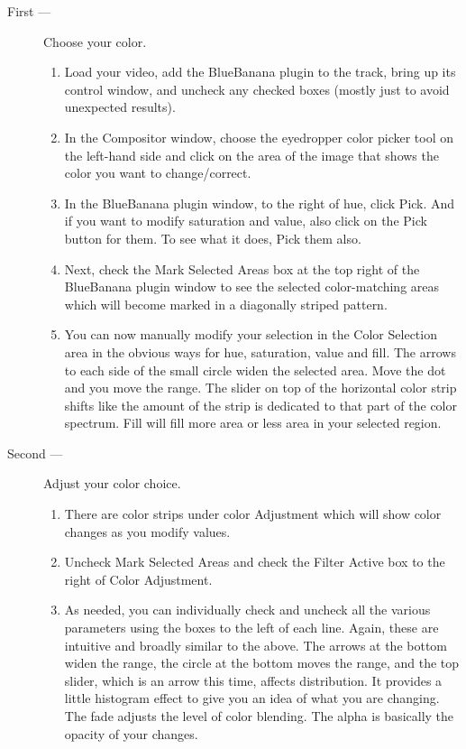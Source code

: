 \begin{description}
    \item[First ---] Choose your color.
    \begin{enumerate}
        \item Load your video, add the BlueBanana plugin to the track, bring up its control window, and uncheck any checked boxes (mostly just to avoid unexpected results).
        \item In the Compositor window, choose the eyedropper color picker tool on the left-hand side and click on the area of the image that shows the color you want to change/correct.
        \item In the BlueBanana plugin window, to the right of hue, click Pick. And if you want to modify saturation and value, also click on the Pick button for them. To see what it does, Pick them also.
        \item Next, check the Mark Selected Areas box at the top right of the BlueBanana plugin window to see the selected color-matching areas which will become marked in a diagonally striped pattern.
        \item You can now manually modify your selection in the Color Selection area in the obvious ways for hue, saturation, value and fill. The arrows to each side of the small circle widen the selected area. Move the dot and you move the range. The slider on top of the horizontal color strip shifts like the amount of the strip is dedicated to that part of the color spectrum. Fill will fill more area or less area in your selected region.
    \end{enumerate}
    \item[Second ---] Adjust your color choice.
    \begin{enumerate}
        \item There are color strips under color Adjustment which will show color changes as you modify values.
        \item Uncheck Mark Selected Areas and check the Filter Active box to the right of Color Adjustment.
        \item As needed, you can individually check and uncheck all the various parameters using the boxes to the left of each line. Again, these are intuitive and broadly similar to the above. The arrows at the bottom widen the range, the circle at the bottom moves the range, and the top slider, which is an arrow this time, affects distribution. It provides a little histogram effect to give you an idea of what you are changing. The fade adjusts the level of color blending. The alpha is basically the opacity of your changes.
    \end{enumerate}
\end{description}

